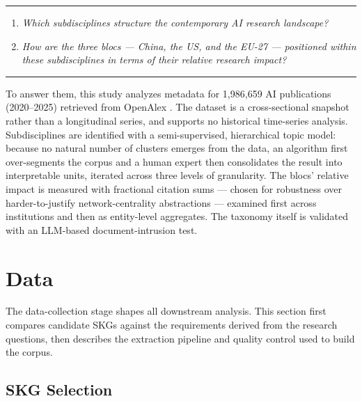 \documentclass{article}
\let\cite\parencite
\begin{document}
	\vspace{1em}
	\rule{\linewidth}{0.4pt}
	
	\begin{enumerate}
		\item[\textbf{RQ1}]\hspace*{2em}\parbox[t]{\dimexpr\linewidth-2em}{
			\textit{Which subdisciplines structure the contemporary AI research landscape?}
		}
		\vspace{0.5em}
		
		\item[\textbf{RQ2}]\hspace*{2em}\parbox[t]{\dimexpr\linewidth-2em}{
			\textit{How are the three blocs --- China, the US, and the EU-27 --- positioned within these subdisciplines in terms of their relative research impact?}
		}
	\end{enumerate}
	
	\vspace{0.25em}
	\rule{\linewidth}{0.4pt}
	\vspace{1em}
	
	To answer them, this study analyzes metadata for 1,986,659 AI publications (2020--2025) retrieved from OpenAlex \cite{openalex2023}. The dataset is a cross-sectional snapshot rather than a longitudinal series, and supports no historical time-series analysis. Subdisciplines are identified with a semi-supervised, hierarchical topic model: because no natural number of clusters emerges from the data, an algorithm first over-segments the corpus and a human expert then consolidates the result into interpretable units, iterated across three levels of granularity. The blocs' relative impact is measured with fractional citation sums --- chosen for robustness over harder-to-justify network-centrality abstractions --- examined first across institutions and then as entity-level aggregates. The taxonomy itself is validated with an LLM-based document-intrusion test.
	
	\section{Data}
	
	The data-collection stage shapes all downstream analysis. This section first compares candidate SKGs against the requirements derived from the research questions, then describes the extraction pipeline and quality control used to build the corpus.
	
	\subsection{SKG Selection}
	\label{skg_selection}
	
\end{document}
